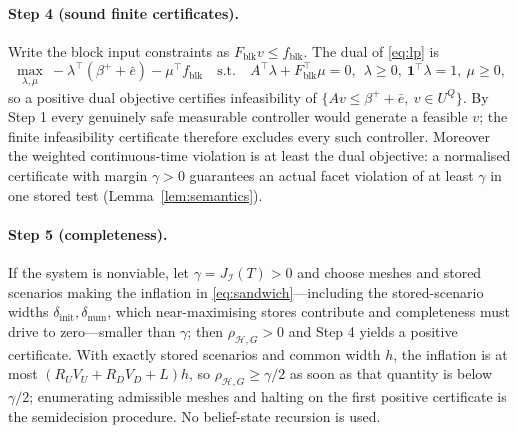 \documentclass[11pt,a4paper]{article}
\theoremstyle{plain}
\theoremstyle{definition}
\theoremstyle{remark}
\newcommand{\calI}{\mathcal{I}}
\newcommand{\calH}{\mathcal{H}}
\newcommand{\J}{J_{\calI}(T)}
\newcommand{\rhoHG}{\rho_{\calH,G}}
\newcommand{\ebar}{\bar{e}}
\begin{document}
\paragraph{Step 4 (sound finite certificates).}
Write the block input constraints as $F_{\mathrm{blk}}v\le f_{\mathrm{blk}}$. The dual of \eqref{eq:lp} is
\begin{equation}\label{eq:dual}
\max_{\lambda,\mu}\ -\lambda^\top(\beta^++\ebar)-\mu^\top f_{\mathrm{blk}}\quad\text{s.t.}\quad A^\top\lambda+F_{\mathrm{blk}}^\top\mu=0,\ \ \lambda\ge0,\ \mathbf 1^\top\lambda=1,\ \mu\ge0 ,
\end{equation}
so a positive dual objective certifies infeasibility of $\{Av\le\beta^++\ebar,\ v\in U^Q\}$. By Step 1 every genuinely safe measurable controller would generate a feasible $v$; the finite infeasibility certificate therefore excludes every such controller. Moreover the weighted continuous-time violation is at least the dual objective: a normalised certificate with margin $\gamma>0$ guarantees an actual facet violation of at least $\gamma$ in one stored test (Lemma~\ref{lem:semantics}).

\paragraph{Step 5 (completeness).}
If the system is nonviable, let $\gamma=\J>0$ and choose meshes and stored scenarios making the inflation in \eqref{eq:sandwich}---including the stored-scenario widths $\delta_{\mathrm{init}},\delta_{\mathrm{num}}$, which near-maximising stores contribute and completeness must drive to zero---smaller than $\gamma$; then $\rhoHG>0$ and Step 4 yields a positive certificate. With exactly stored scenarios and common width $h$, the inflation is at most $(R_UV_U+R_DV_D+L)h$, so $\rhoHG\ge\gamma/2$ as soon as that quantity is below $\gamma/2$; enumerating admissible meshes and halting on the first positive certificate is the semidecision procedure. No belief-state recursion is used.
\end{document}
